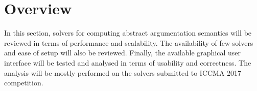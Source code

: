 \section{Overview}
In this section, solvers for computing abstract argumentation semantics will be reviewed in terms of performance and scalability. The availability of few solvers and ease of setup will also be reviewed. Finally, the available graphical user interface will be tested and analysed in terms of usability and correctness. The analysis will be mostly performed on the solvers submitted to ICCMA 2017 competition.